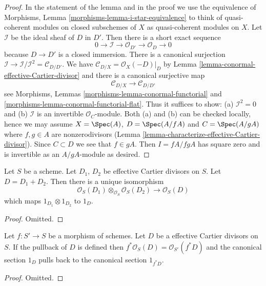 \begin{proof}
In the statement of the lemma and in the proof we use the equivalence of
Morphisms, Lemma \ref{morphisms-lemma-i-star-equivalence} to think of
quasi-coherent modules on closed subschemes of $X$
as quasi-coherent modules on $X$. Let $\mathcal{I}$ be the ideal
sheaf of $D$ in $D'$. Then there is a short exact sequence
$$
0 \to \mathcal{I} \to \mathcal{O}_{D'} \to \mathcal{O}_D \to 0
$$
because $D \to D'$ is a closed immersion. There is a
canonical surjection
$\mathcal{I} \to \mathcal{I}/\mathcal{I}^2 = \mathcal{C}_{D/D'}$.
We have $\mathcal{C}_{D/X} = \mathcal{O}_X(-D)|_D$ by
Lemma \ref{lemma-conormal-effective-Cartier-divisor}
and there is a canonical surjective map
$$
\mathcal{C}_{D/X} \longrightarrow \mathcal{C}_{D/D'}
$$
see Morphisms, Lemmas \ref{morphisms-lemma-conormal-functorial} and
\ref{morphisms-lemma-conormal-functorial-flat}.
Thus it suffices to show: (a) $\mathcal{I}^2 = 0$ and (b)
$\mathcal{I}$ is an invertible $\mathcal{O}_C$-module.
Both (a) and (b) can be checked locally, hence we may assume
$X = \Spec(A)$, $D = \Spec(A/fA)$ and $C = \Spec(A/gA)$ where
$f, g \in A$ are nonzerodivisors
(Lemma \ref{lemma-characterize-effective-Cartier-divisor}).
Since $C \subset D$ we see
that $f \in gA$. Then $I = fA/fgA$ has square zero and is invertible
as an $A/gA$-module as desired.
\end{proof}

\begin{lemma}
\label{lemma-invertible-sheaf-sum-effective-Cartier-divisors}
Let $S$ be a scheme.
Let $D_1$, $D_2$ be effective Cartier divisors on $S$.
Let $D = D_1 + D_2$.
Then there is a unique isomorphism
$$
\mathcal{O}_S(D_1) \otimes_{\mathcal{O}_S} \mathcal{O}_S(D_2)
\longrightarrow
\mathcal{O}_S(D)
$$
which maps $1_{D_1} \otimes 1_{D_2}$ to $1_D$.
\end{lemma}

\begin{proof}
Omitted.
\end{proof}

\begin{lemma}
\label{lemma-pullback-effective-Cartier-divisors}
Let $f : S' \to S$ be a morphism of schemes.
Let $D$ be a effective Cartier divisors on $S$.
If the pullback of $D$ is defined then
$f^*\mathcal{O}_S(D) = \mathcal{O}_{S'}(f^*D)$
and the canonical section $1_D$ pulls back to
the canonical section $1_{f^*D}$.
\end{lemma}

\begin{proof}
Omitted.
\end{proof}

